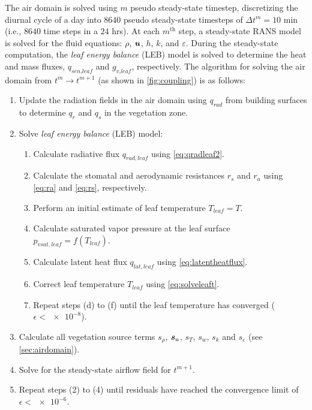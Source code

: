 The air domain is solved using $m$ pseudo steady-state timestep, discretizing the diurnal cycle of a day into $\num{8640}$ pseudo steady-state timesteps of $\Delta t^m = 10$ min (i.e., $8640$ time steps in a $24$ hrs). At each $m^{\mathrm{th}}$ step, a steady-state RANS model is solved for the fluid equations: $\rho$, $\textbf{\textit{u}}$, $h$, $k$, and $\varepsilon$. During the steady-state computation, the \textit{leaf energy balance} (LEB) model is solved to determine the heat and mass fluxes, $q_{\textit{sen,leaf}}$ and $g_{\textit{v,leaf}}$, respectively. The algorithm for solving the air domain from $t^{m}\rightarrow t^{m+1}$ (as shown in \cref{fig:coupling}) is as follows:
\begin{enumerate}
	\item Update the radiation fields in the air domain using $q_{\textit{rad}}$ from building surfaces to determine $q_{\textit{r}}$ and $q_{\textit{s}}$ in the vegetation zone.
	\item Solve \textit{leaf energy balance} (LEB) model:
	\begin{enumerate}
		\item Calculate radiative flux $q_{\mathit{rad,leaf}}$ using \cref{eq:qradleaf2}.
		\item Calculate the stomatal and aerodynamic resistances $r_{s}$ and $r_{a}$ using \cref{eq:ra} and \cref{eq:rs}, respectively.
		\item Perform an initial estimate of leaf temperature $T_{\mathit{leaf}}=T$.
		\item Calculate saturated vapor pressure at the leaf surface $p_{\mathit{vsat,leaf}}=f(T_{\mathit{leaf}})$.
		\item Calculate latent heat flux $q_{\mathit{lat,leaf}}$ using \cref{eq:latentheatflux}. 
		\item Correct leaf temperature $T_{\mathit{leaf}}$ using \cref{eq:solveleaft}.
		\item Repeat steps (d) to (f) until the leaf temperature has converged ($\epsilon < \num{e-8}$).
	\end{enumerate}
	\item Calculate all vegetation source terms $s_\rho$, $\textbf{\textit{s}}_u$, $s_T$, $s_w$, $s_k$ and $s_{\varepsilon}$ (see \cref{sec:airdomain}).
	\item Solve for the steady-state airflow field for $t^{m+1}$.
	\item Repeat steps (2) to (4) until residuals have reached the convergence limit of $\epsilon < \num{e-6}$.
\end{enumerate}

